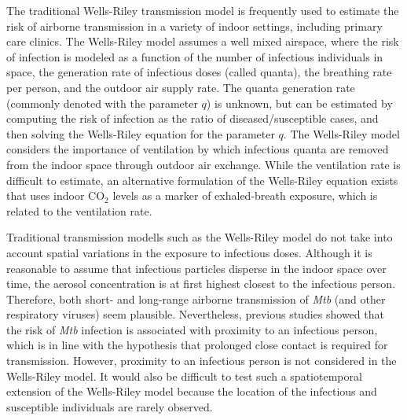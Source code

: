 \documentclass[fleqn,11pt]{wlscirep}
\begin{document}
The traditional Wells-Riley transmission model\cite{Riley1978AJE} is frequently used to estimate the risk of airborne transmission in a variety of indoor settings\cite{Andrews2014JID,Taylor2016IJTLD,Hella2017JInfect,Zemouri2020JDR}, including primary care clinics\cite{Zurcher2022JID,McCreesh2021BMJGlobalHealth}. The Wells-Riley model assumes a well mixed airspace, where the risk of infection is modeled as a function of the number of infectious individuals in space, the generation rate of infectious doses (called quanta), the breathing rate per person, and the outdoor air supply rate. The quanta generation rate (commonly denoted with the parameter $q$) is unknown, but can be estimated by computing the risk of infection as the ratio of diseased/susceptible cases, and then solving the Wells-Riley equation for the parameter $q$\cite{Nardell1991ARRD,Escombe2008PLoSMed}. The Wells-Riley model considers the importance of ventilation by which infectious quanta are removed from the indoor space through outdoor air exchange. While the ventilation rate is difficult to estimate, an alternative formulation of the Wells-Riley equation exists that uses indoor CO$_2$ levels as a marker of exhaled-breath exposure\cite{Rudnick2003IndoorAir}, which is related to the ventilation rate. 

Traditional transmission modells such as the Wells-Riley model do not take into account spatial variations in the exposure to infectious doses. Although it is reasonable to assume that infectious particles disperse in the indoor space over time, the aerosol concentration is at first highest closest to the infectious person\cite{Vuorinen2020SafSci,Chen2020BuildEnv}. Therefore, both short- and long-range airborne transmission of \emph{Mtb} (and other respiratory viruses) seem plausible. Nevertheless, previous studies showed that the risk of \emph{Mtb} infection is associated with proximity to an infectious person\cite{Ko2004RiskAnal,Kenyon1996NEJM}, which is in line with the hypothesis that prolonged close contact is required for transmission\cite{Leung2020NatMed,Brankston2007LancetID,Narasimhan2013PulmonaryMed}. However, proximity to an infectious person is not considered in the Wells-Riley model. It would also be difficult to test such a spatiotemporal extension of the Wells-Riley model because the location of the infectious and susceptible individuals are rarely observed.    
\end{document}
